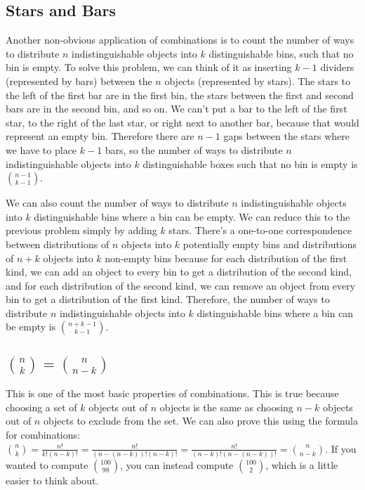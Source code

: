 \documentclass[twocolumn]{article}
\begin{document}
\subsection*{Stars and Bars}
Another non-obvious application of combinations is to count the number of ways 
to distribute $n$ indistinguishable objects into $k$ distinguishable bins, such 
that no bin is empty. To solve this problem, we can think of it as inserting $k 
- 1$ dividers (represented by bars) between the $n$ objects (represented by 
stars). The stars to the left of the first bar are in the first bin, the stars 
between the first and second bars are in the second bin, and so on. We can't put 
a bar to the left of the first star, to the right of the last star, or right 
next to another bar, because that would represent an empty bin. Therefore there 
are $n - 1$ gaps between the stars where we have to place $k - 1$ bars, so the 
number of ways to distribute $n$ indistinguishable objects into $k$ 
distinguishable boxes such that no bin is empty is $\binom{n - 1}{k - 1}$.

We can also count the number of ways to distribute $n$ indistinguishable objects 
into $k$ distinguishable bins where a bin can be empty. We can reduce this to 
the previous problem simply by adding $k$ stars. There's a one-to-one 
correspondence between distributions of $n$ objects into $k$ potentially empty 
bins and distributions of $n + k$ objects into $k$ non-empty bins because for 
each distribution of the first kind, we can add an object to every bin to get a 
distribution of the second kind, and for each distribution of the second kind, 
we can remove an object from every bin to get a distribution of the first kind. 
Therefore, the number of ways to distribute $n$ indistinguishable objects into 
$k$ distinguishable bins where a bin can be empty is $\binom{n + k - 1}{k - 1}$.

\subsection*{$\binom{n}{k} = \binom{n}{n - k}$}
This is one of the most basic properties of combinations. This is true because 
choosing a set of $k$ objects out of $n$ objects is the same as choosing $n - k$ 
objects out of $n$ objects to exclude from the set. We can also prove this using 
the formula for combinations: $\binom{n}{k} = \frac{n!}{k!(n - k)!} = 
\frac{n!}{(n - (n - k))!(n - k)!} = \frac{n!}{(n - k)!(n - (n - k))!} = 
\binom{n}{n - k}$. If you wanted to compute $\binom{100}{98}$, you can instead 
compute $\binom{100}{2}$, which is a little easier to think about.
\end{document}

